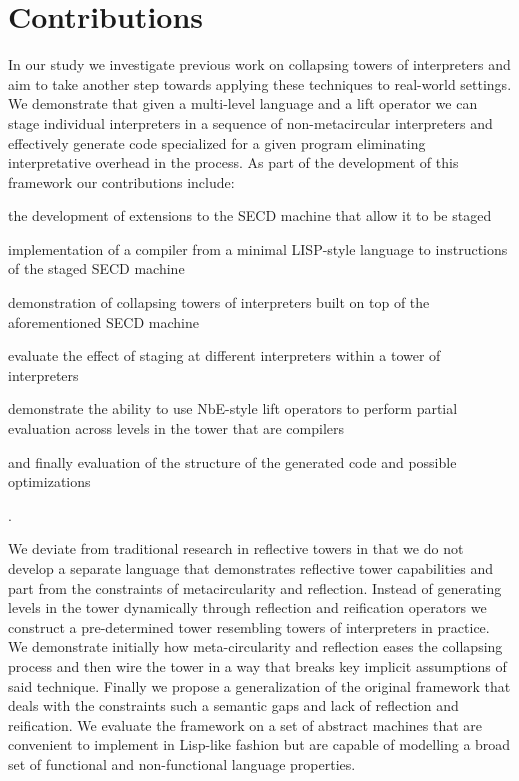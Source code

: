 \documentclass[fleqn]{article}
\theoremstyle{definition}
\begin{document}
\section{Contributions}
In our study we investigate previous work on collapsing towers of interpreters and aim to take another step towards applying these techniques to real-world settings. We demonstrate that given a multi-level language and a lift operator we can stage individual interpreters in a sequence of non-metacircular interpreters and effectively generate code specialized for a given program eliminating interpretative overhead in the process. As part of the development of this framework our contributions include:
\begin{enumerate*}[label=(\arabic*)]
	\item the development of extensions to the SECD machine that allow it to be staged
	\item implementation of a compiler from a minimal LISP-style language to instructions of the staged SECD machine
	\item demonstration of collapsing towers of interpreters built on top of the aforementioned SECD machine
	\item evaluate the effect of staging at different interpreters within a tower of interpreters
	\item demonstrate the ability to use NbE-style lift operators to perform partial evaluation across levels in the tower that are compilers
	\item and finally evaluation of the structure of the generated code and possible optimizations
\end{enumerate*}.

We deviate from traditional research in reflective towers in that we do not develop a separate language that demonstrates reflective tower capabilities and part from the constraints of metacircularity and reflection.
Instead of generating levels in the tower dynamically through reflection and reification operators we construct a pre-determined tower resembling towers of interpreters in practice. We demonstrate initially how meta-circularity and reflection eases the collapsing process and then wire the tower in a way that breaks key implicit assumptions of said technique. Finally we propose a generalization of the original framework that deals with the constraints such a semantic gaps and lack of reflection and reification. We evaluate the framework on a set of abstract machines that are convenient to implement in Lisp-like fashion but are capable of modelling a broad set of functional and non-functional language properties.
\end{document}
